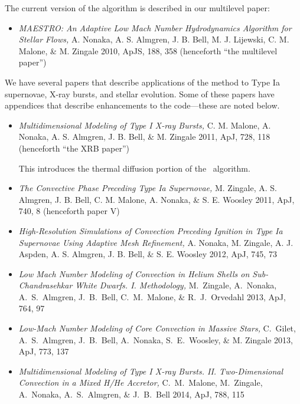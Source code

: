 \noindent The current version of the algorithm is described in our
multilevel paper:
\begin{itemize}
\item {\em MAESTRO: An Adaptive Low Mach Number Hydrodynamics Algorithm for Stellar
  Flows,} A. Nonaka, A. S. Almgren, J. B. Bell, M. J. Lijewski, C. M. Malone,
  \& M. Zingale 2010, ApJS, 188, 358 (henceforth ``the multilevel paper'')
\end{itemize}

\noindent We have several papers that describe applications of the
method to Type Ia supernovae, X-ray bursts, and stellar evolution.  Some of these
papers have appendices that describe enhancements to the code---these are noted
below.
\begin{itemize}
\item {\em Multidimensional Modeling of Type I X-ray Bursts,}
  C. M. Malone, A. Nonaka, A. S. Almgren, J. B. Bell, \& M. Zingale 2011,
  ApJ, 728, 118 (henceforth ``the XRB paper'')


  This introduces the thermal diffusion portion of the \maestro\ algorithm.

\item {\em The Convective Phase Preceding Type Ia Supernovae,}
  M. Zingale, A. S. Almgren, J. B. Bell, C. M. Malone, A. Nonaka, \& S. E. Woosley 2011, ApJ,
  740, 8 (henceforth paper V)

\item {\em High-Resolution Simulations of Convection Preceding Ignition in
  Type Ia Supernovae Using Adaptive Mesh Refinement,}
  A. Nonaka, M. Zingale, A. J. Aspden, A. S. Almgren, J. B. Bell, \& S. E. Woosley 2012, 
  ApJ, 745, 73

\item {\em Low Mach Number Modeling of Convection in Helium Shells on
  Sub-Chandrasehkar White Dwarfs. I. Methodology,} M.~Zingale,
  A.~Nonaka, A.~S.~Almgren, J.~B.~Bell, C.~M.~Malone, \&
  R.~J.~Orvedahl 2013, ApJ, 764, 97

\item {\em Low-Mach Number Modeling of Core Convection in Massive Stars,}
  C.~Gilet, A.~S.~Almgren, J.~B.~Bell, A.~Nonaka, S.~E.~Woosley, \& M. Zingale
  2013, ApJ, 773, 137


\item {\em Multidimensional Modeling of Type I X-ray Bursts. II. Two-Dimensional 
       Convection in a Mixed H/He Accretor,}
   C.~M.~Malone, M.~Zingale, A.~Nonaka, A.~S.~Almgren, \& J.~B.~Bell 2014, ApJ, 788, 115


\end{itemize}

